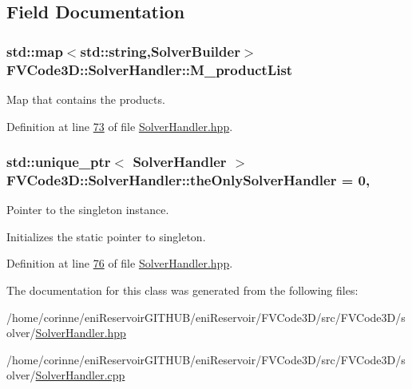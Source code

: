 \subsection{Field Documentation}
\subsubsection[{\texorpdfstring{M\+\_\+product\+List}{M_productList}}]{\setlength{\rightskip}{0pt plus 5cm}std\+::map$<$std\+::string,{\bf Solver\+Builder}$>$ F\+V\+Code3\+D\+::\+Solver\+Handler\+::\+M\+\_\+product\+List\hspace{0.3cm}{\ttfamily [private]}}\hypertarget{classFVCode3D_1_1SolverHandler_a8c2ce305ada54d628a080f7f33d09140}{}\label{classFVCode3D_1_1SolverHandler_a8c2ce305ada54d628a080f7f33d09140}


Map that contains the products. 



Definition at line \hyperlink{SolverHandler_8hpp_source_l00073}{73} of file \hyperlink{SolverHandler_8hpp_source}{Solver\+Handler.\+hpp}.

\subsubsection[{\texorpdfstring{the\+Only\+Solver\+Handler}{theOnlySolverHandler}}]{\setlength{\rightskip}{0pt plus 5cm}std\+::unique\+\_\+ptr$<$ {\bf Solver\+Handler} $>$ F\+V\+Code3\+D\+::\+Solver\+Handler\+::the\+Only\+Solver\+Handler = 0\hspace{0.3cm}{\ttfamily [static]}, {\ttfamily [private]}}\hypertarget{classFVCode3D_1_1SolverHandler_acdb1d28e913ae90bc3744521893f929e}{}\label{classFVCode3D_1_1SolverHandler_acdb1d28e913ae90bc3744521893f929e}


Pointer to the singleton instance. 

Initializes the static pointer to singleton. 

Definition at line \hyperlink{SolverHandler_8hpp_source_l00076}{76} of file \hyperlink{SolverHandler_8hpp_source}{Solver\+Handler.\+hpp}.



The documentation for this class was generated from the following files\+:\begin{DoxyCompactItemize}
\item 
/home/corinne/eni\+Reservoir\+G\+I\+T\+H\+U\+B/eni\+Reservoir/\+F\+V\+Code3\+D/src/\+F\+V\+Code3\+D/solver/\hyperlink{SolverHandler_8hpp}{Solver\+Handler.\+hpp}\item 
/home/corinne/eni\+Reservoir\+G\+I\+T\+H\+U\+B/eni\+Reservoir/\+F\+V\+Code3\+D/src/\+F\+V\+Code3\+D/solver/\hyperlink{SolverHandler_8cpp}{Solver\+Handler.\+cpp}\end{DoxyCompactItemize}
